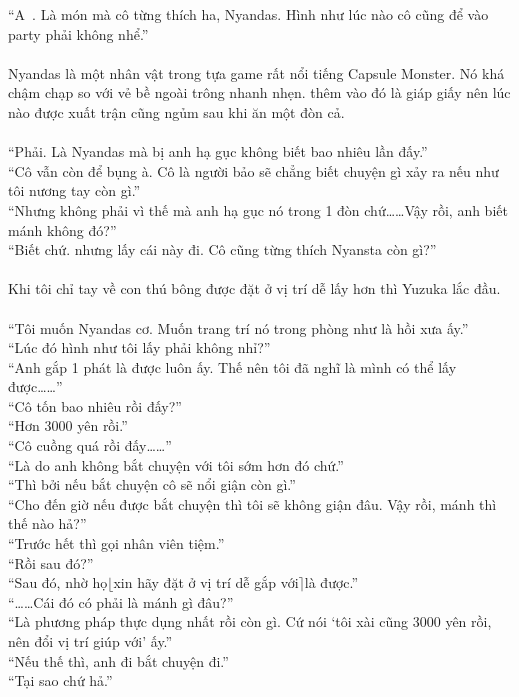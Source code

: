 \documentclass[12pt,a4paper, twosides]{book}
\begin{document}
“A~. Là món mà cô từng thích ha, Nyandas. Hình như lúc nào cô cũng để vào party phải không nhể.”\\
\\
Nyandas là một nhân vật trong tựa game rất nổi tiếng Capsule Monster. Nó khá chậm chạp so với vẻ bề ngoài trông nhanh nhẹn. thêm vào đó là giáp giấy nên lúc nào được xuất trận cũng ngủm sau khi ăn một đòn cả.\\
\\
“Phải. Là Nyandas mà bị anh hạ gục không biết bao nhiêu lần đấy.”\\
“Cô vẫn còn để bụng à. Cô là người bảo sẽ chẳng biết chuyện gì xảy ra nếu như tôi nương tay còn gì.”\\
“Nhưng không phải vì thế mà anh hạ gục nó trong 1 đòn chứ……Vậy rồi, anh biết mánh không đó?”\\
“Biết chứ. nhưng lấy cái này đi. Cô cũng từng thích Nyansta còn gì?”\\
\\
Khi tôi chỉ tay về con thú bông được đặt ở vị trí dễ lấy hơn thì Yuzuka lắc đầu.\\
\\
“Tôi muốn Nyandas cơ. Muốn trang trí nó trong phòng như là hồi xưa ấy.”\\
“Lúc đó hình như tôi lấy phải không nhỉ?”\\
“Anh gắp 1 phát là được luôn ấy. Thế nên tôi đã nghĩ là mình có thể lấy được……”\\
“Cô tốn bao nhiêu rồi đấy?”\\
“Hơn 3000 yên rồi.”\\
“Cô cuồng quá rồi đấy……”\\
“Là do anh không bắt chuyện với tôi sớm hơn đó chứ.”\\
“Thì bởi nếu bắt chuyện cô sẽ nổi giận còn gì.”\\
“Cho đến giờ nếu được bắt chuyện thì tôi sẽ không giận đâu. Vậy rồi, mánh thì thế nào hả?”\\
“Trước hết thì gọi nhân viên tiệm.”\\
“Rồi sau đó?”\\
“Sau đó, nhờ họ$\lfloor$xin hãy đặt ở vị trí dễ gắp với$\rceil$là được.”\\
“……Cái đó có phải là mánh gì đâu?”\\
“Là phương pháp thực dụng nhất rồi còn gì. Cứ nói ‘tôi xài cũng 3000 yên rồi, nên đổi vị trí giúp với’ ấy.”\\
“Nếu thế thì, anh đi bắt chuyện đi.”\\
“Tại sao chứ hả.”\\
\end{document}
